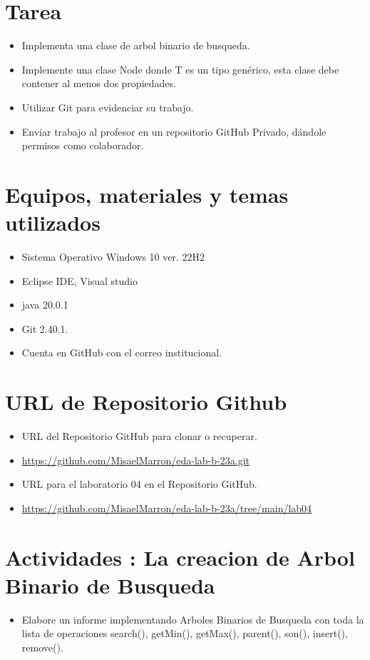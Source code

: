 \documentclass{article}
\begin{document}
	\section{Tarea}
	\begin{itemize}		
		\item Implementa una clase de arbol binario de busqueda.
		\item Implemente una clase Node donde T es un tipo genérico, esta clase debe contener al menos dos propiedades.
		\item Utilizar Git para evidenciar su trabajo.
		\item Enviar trabajo al profesor en un repositorio GitHub Privado, dándole permisos como colaborador.
	\end{itemize}
		
	\section{Equipos, materiales y temas utilizados}
	\begin{itemize}
		\item Sistema Operativo Windows 10  ver. 22H2
		\item Eclipse IDE, Visual studio
		\item java 20.0.1
		\item Git 2.40.1.
		\item Cuenta en GitHub con el correo institucional.	
	\end{itemize}
	
	\section{URL de Repositorio Github}
	\begin{itemize}
		\item URL del Repositorio GitHub para clonar o recuperar.
		\item \url{https://github.com/MisaelMarron/eda-lab-b-23a.git}
		\item URL para el laboratorio 04 en el Repositorio GitHub.
		\item \url{https://github.com/MisaelMarron/eda-lab-b-23a/tree/main/lab04}
	\end{itemize}
	
	\clearpage
	\section{Actividades  : La creacion de Arbol Binario de Busqueda}
	\begin{itemize}
		\item Elabore un informe implementando Arboles Binarios de Busqueda con toda la lista de operaciones search(), getMin(), getMax(), parent(), son(), insert(), remove().     
		
	\end{itemize}
	
\end{document}
